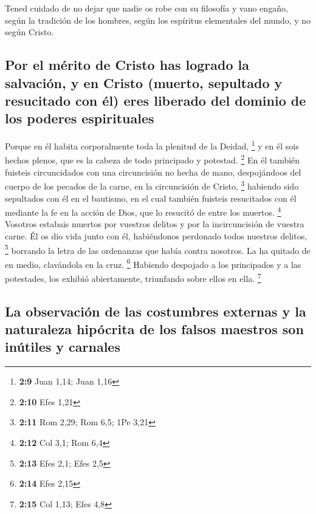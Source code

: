 \begin{paracol}{2}
 Tened cuidado de no dejar que nadie os robe con su
filosofía y vano engaño, según la tradición de los hombres, según los
espíritus elementales del mundo, y no según Cristo.

\hypertarget{por-el-muxe9rito-de-cristo-has-logrado-la-salvaciuxf3n-y-en-cristo-muerto-sepultado-y-resucitado-con-uxe9l-eres-liberado-del-dominio-de-los-poderes-espirituales}{%
\subsection{Por el mérito de Cristo has logrado la salvación, y en
Cristo (muerto, sepultado y resucitado con él) eres liberado del dominio
de los poderes
espirituales}\label{por-el-muxe9rito-de-cristo-has-logrado-la-salvaciuxf3n-y-en-cristo-muerto-sepultado-y-resucitado-con-uxe9l-eres-liberado-del-dominio-de-los-poderes-espirituales}}

 Porque en él habita corporalmente toda la plenitud de la
Deidad, \footnote{\textbf{2:9} Juan 1,14; Juan 1,16}  y
en él sois hechos plenos, que es la cabeza de todo principado y
potestad. \footnote{\textbf{2:10} Efes 1,21}  En él
también fuisteis circuncidados con una circuncisión no hecha de mano,
despojándoos del cuerpo de los pecados de la carne, en la circuncisión
de Cristo, \footnote{\textbf{2:11} Rom 2,29; Rom 6,5; 1Pe 3,21}
 habiendo sido sepultados con él en el bautismo, en el
cual también fuisteis resucitados con él mediante la fe en la acción de
Dios, que lo resucitó de entre los muertos. \footnote{\textbf{2:12} Col
  3,1; Rom 6,4}  Vosotros estabais muertos por vuestros
delitos y por la incircuncisión de vuestra carne. Él os dio vida junto
con él, habiéndonos perdonado todos nuestros delitos, \footnote{\textbf{2:13}
  Efes 2,1; Efes 2,5}  borrando la letra de las
ordenanzas que había contra nosotros. La ha quitado de en medio,
clavándola en la cruz. \footnote{\textbf{2:14} Efes 2,15}
 Habiendo despojado a los principados y a las potestades,
los exhibió abiertamente, triunfando sobre ellos en ella. \footnote{\textbf{2:15}
  Col 1,13; Efes 4,8}

\hypertarget{la-observaciuxf3n-de-las-costumbres-externas-y-la-naturaleza-hipuxf3crita-de-los-falsos-maestros-son-inuxfatiles-y-carnales}{%
\subsection{La observación de las costumbres externas y la naturaleza
hipócrita de los falsos maestros son inútiles y
carnales}\label{la-observaciuxf3n-de-las-costumbres-externas-y-la-naturaleza-hipuxf3crita-de-los-falsos-maestros-son-inuxfatiles-y-carnales}}


\end{paracol}
